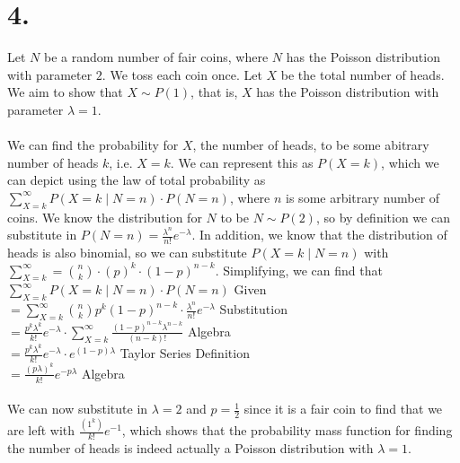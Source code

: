 \documentclass{article}
\begin{document}
\section*{4.}
{\Large 

Let $N$ be a random number of fair coins, where $N$ has the Poisson distribution with parameter $2$. We toss each coin once. Let $X$ be the total number of heads. We aim to show that $X\sim P(1)$, that is, $X$ has the Poisson distribution with parameter $\lambda=1$. \\ \\ 
We can find the probability for $X$, the number of heads, to be some abitrary number of heads $k$, i.e. $X = k$. We can represent this as $P(X = k)$, which we can depict using the law of total probability as $\sum_{X = k}^{\infty} P(X = k \mid N = n) \cdot P(N = n)$, where $n$ is some arbitrary number of coins. We know the distribution for $N$ to be $N \sim P(2)$, so by definition we can substitute in $P(N = n) = \frac{\lambda^n}{n!}e^{-\lambda}$. In addition, we know that the distribution of heads is also binomial, so we can substitute $P(X = k \mid N = n)$ with $\sum_{X = k}^{\infty} = \binom{n}{k} \cdot (p)^k \cdot (1 - p)^{n - k}$. Simplifying, we can find that \\ 
$\sum_{X = k}^{\infty} P(X = k \mid N = n) \cdot P(N = n)$ \hfill Given\\
$ = \sum_{X = k}^{\infty} \binom{n}{k}p^k(1-p)^{n-k} \cdot \frac{\lambda^n}{n!}e^{-\lambda}$ \hfill Substitution\\ 
$= \frac{p^k\lambda^k}{k!}e^{-\lambda} \cdot \sum_{X = k}^{\infty} \frac{(1-p)^{n-k}\lambda^{n-k}}{(n-k)!}$ \hfill Algebra\\
$= \frac{p^k\lambda^k}{k!}e^{-\lambda} \cdot e^{(1-p)\lambda}$ \hfill Taylor Series Definition\\
$= \frac{(p\lambda)^k}{k!}e^{-p\lambda}$ \hfill Algebra\\ \\ 
We can now substitute in $\lambda = 2$ and $p = \frac{1}{2}$ since it is a fair coin to find that we are left with $\frac{(1^k)}{k!}e^{-1}$, which shows that the probability mass function for finding the number of heads is indeed actually a Poisson distribution with $\lambda = 1$.

}
\end{document}
